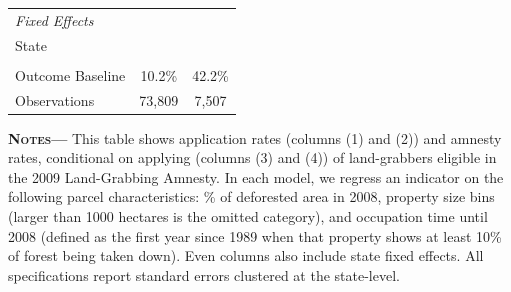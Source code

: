 \documentclass[12pt]{article}
\begin{document}
\begin{center}
\begin{threeparttable}[b]
\begin{tabular}{l*{4}c}
\textit{Fixed Effects} \\
\quad State  & & \cellcolor{green!50} & & \cellcolor{green!50}\\
& \\
Outcome Baseline & \multicolumn{2}{c}{10.2\%}  & \multicolumn{2}{c}{42.2\%} \\ 
Observations & \multicolumn{2}{c}{73,809} & \multicolumn{2}{c}{7,507} \\
   \midrule \midrule
	\end{tabular}
			\begin{tablenotes}[flushleft]
   \item {\justify\singlespacing\footnotesize {\textsc{\textbf{Notes---}}} This table shows application rates (columns (1) and (2)) and amnesty rates, conditional on applying (columns (3) and (4)) of land-grabbers eligible in the 2009 Land-Grabbing Amnesty. In each model, we regress an indicator on the following parcel characteristics: \% of deforested area in 2008, property size bins (larger than 1000 hectares is the omitted category), and occupation time until 2008 (defined as the first year since 1989 when that property shows at least 10\% of forest being taken down). Even columns also include state fixed effects. All specifications report standard errors clustered at the state-level.}
    \end{tablenotes}
     \label{tab:25}
\end{threeparttable}
\end{center}

\clearpage
\end{document}
